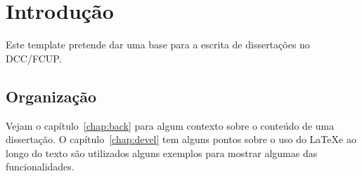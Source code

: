 \chapter{Introdução}\label{chap:intro}

Este template pretende dar uma base para a escrita de dissertações no \ac{DCC}/\ac{FCUP}.

\section{Organização}
Vejam o capítulo~\ref{chap:back} para algum contexto sobre o conteúdo de uma dissertação. O capítulo~\ref{chap:devel} tem alguns pontos sobre o uso do \LaTeX e ao longo do texto são utilizados alguns exemplos para mostrar algumas das funcionalidades.




